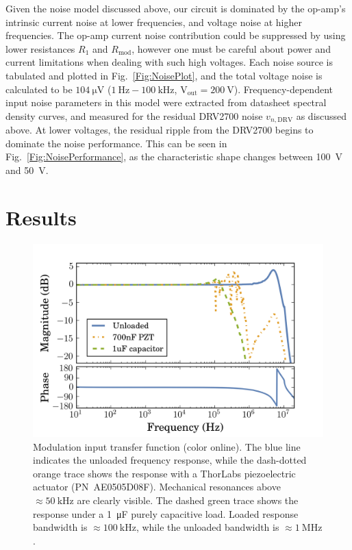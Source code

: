 \documentclass[aip,rsi,reprint]{revtex4-1} %
\begin{document}
Given the noise model discussed above, our circuit is dominated by the op-amp's intrinsic current noise at lower frequencies, and voltage noise at higher frequencies.
The op-amp current noise contribution could be suppressed by using lower resistances $R_1$ and $R_\text{mod}$, however one must be careful about power and current limitations when dealing with such high voltages.
Each noise source is tabulated and plotted in Fig.~\ref{Fig:NoisePlot}, and the total voltage noise  is calculated to be $\SI{104}{\micro\volt}$ ($\SI{1}{\hertz} - \SI{100}{\kilo\hertz}$, $\text{V}_\text{out} = \SI{200}{\volt}$).
Frequency-dependent input noise parameters in this model were extracted from datasheet spectral density curves\cite{LM7171Datasheet,AD56XXRDatasheet}, and measured for the residual DRV2700 noise $v_{n,\text{DRV}}$ as discussed above.
At lower voltages, the residual ripple from the DRV2700 begins to dominate the noise performance.
This can be seen in Fig.~\ref{Fig:NoisePerformance}, as the characteristic shape changes between \SI{100}{\volt} and \SI{50}{\volt}.



\section{Results}
\label{Sec:Results}

\begin{figure}[t]
\includegraphics[width=\columnwidth]{fig/PiezoModulationTransfer.png}
\caption{Modulation input transfer function (color online). The blue line indicates the unloaded frequency response, while the dash-dotted orange trace shows the response with a ThorLabs piezoelectric actuator {(PN~AE0505D08F)}. Mechanical resonances above $\approx\SI{50}{\kilo\hertz}$ are clearly visible. The dashed green trace shows the response under a \SI{1}{\micro\farad} purely capacitive load. Loaded response bandwidth is $\approx\SI{100}{\kilo\hertz}$, while the unloaded bandwidth is $\approx\SI{1}{\mega\hertz}$.\label{Fig:TransferFunc}}
\end{figure}
\end{document}
